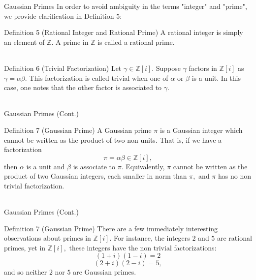\begin{frame}{Gaussian Primes}
    In order to avoid ambiguity in the terms "integer" and "prime", we provide clarification in Definition 5:\\
    \begin{block}{Definition 5 (Rational Integer and Rational Prime)}
         A rational integer is simply an element of $\mathbb{Z}.$ A prime in $\mathbb{Z}$ is called a rational prime. \\\\
    \end{block}
    \begin{block}{Definition 6 (Trivial Factorization)}
        Let $\gamma \in\mathbb{Z}[i].$ Suppose $\gamma$ factors in $\mathbb{Z}[i]$ as $\gamma=\alpha \beta.$ This factorization is called trivial when one of $\alpha$ or $\beta$ is a unit. In this case, one notes that the other factor is associated to $\gamma.$\\\\
    \end{block}
\end{frame}


\begin{frame}{Gaussian Primes (Cont.)}
    \begin{block}{Definition 7 (Gaussian Prime)}
        A Gaussian prime $\pi$ is a Gaussian integer which cannot be written as the product of two non units. That is, if we have a factorization $$\pi = \alpha \beta \in\mathbb{Z}[i],$$
then $\alpha$ is a unit and $\beta$ is associate to $\pi.$ Equivalently, $\pi$ cannot be written as the product of two Gaussian integers, each smaller in norm than $\pi,$ and $\pi$ has no non trivial factorization.\\\\
    \end{block}
\end{frame}


\begin{frame}{Gaussian Primes (Cont.)}
    \begin{block}{Definition 7 (Gaussian Prime)}
        There are a few immediately interesting observations about primes in $\mathbb{Z}[i].$ For instance, the integers $2$ and $5$ are rational primes, yet in $\mathbb{Z}[i],$ these integers have the non trivial factorizations:
$$(1+i)(1-i)=2$$
$$(2+i)(2-i)=5,$$
and so neither $2$ nor $5$ are Gaussian primes. 
    \end{block}
\end{frame}


